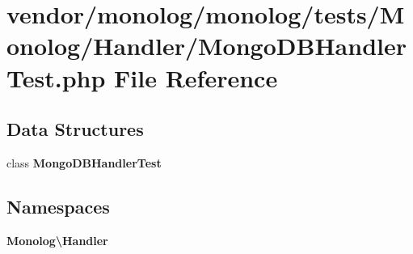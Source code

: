 \section{vendor/monolog/monolog/tests/\+Monolog/\+Handler/\+Mongo\+D\+B\+Handler\+Test.php File Reference}
\label{_mongo_d_b_handler_test_8php}
\subsection*{Data Structures}
\begin{DoxyCompactItemize}
\item 
class {\bf Mongo\+D\+B\+Handler\+Test}
\end{DoxyCompactItemize}
\subsection*{Namespaces}
\begin{DoxyCompactItemize}
\item 
 {\bf Monolog\textbackslash{}\+Handler}
\end{DoxyCompactItemize}
